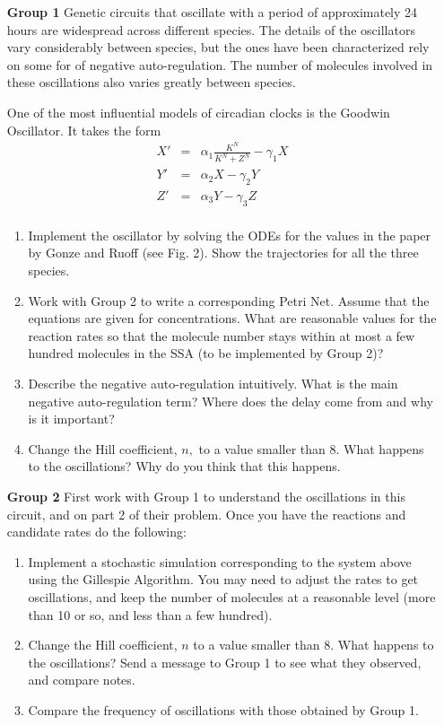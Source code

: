 \documentclass[12pt]{article}
\begin{document}
%
\begin{enumerate}
\item[\bf Group 1] Genetic circuits that oscillate with a period of approximately 24 hours are widespread across different species.  The details of the oscillators  vary considerably between species, but  the ones have been characterized rely on some for of negative auto-regulation. The number of molecules involved in these oscillations also varies greatly between species. 

One of the most influential models of circadian clocks is the Goodwin Oscillator.  It takes the form 
\begin{eqnarray*}
X' &=& \alpha_1 \frac{K^N}{K^N + Z^N} - \gamma_1 X \\
Y' &= & \alpha_2 X - \gamma_2 Y \\
Z' &=& \alpha_3 Y - \gamma_3 Z \\
\end{eqnarray*}

\begin{enumerate}
\item Implement the oscillator by solving the ODEs for the values in the paper by Gonze and Ruoff (see Fig. 2).  Show the trajectories for all the three species.
\item Work with Group 2 to write a corresponding Petri Net.  Assume that the equations are given for concentrations. What are reasonable values for the reaction rates so that the molecule number stays within at most a few hundred molecules in the SSA (to be implemented by Group 2)?  
\item Describe the negative auto-regulation intuitively. What is the main negative auto-regulation term?  Where does the delay come from and why is it important?
\item Change the Hill coefficient, $n,$ to a value smaller than 8. What happens to the oscillations?  Why do you think that this happens.
\end{enumerate}

\item[\bf Group 2] 
First work with Group 1 to understand the oscillations in this circuit, and on part 2 of their problem. Once you have the reactions 
and candidate rates do the following:
\begin{enumerate}
\item Implement a stochastic simulation corresponding to the system above using the Gillespie Algorithm.  You may need to 
adjust the rates to get oscillations, and keep the number of molecules at a reasonable level (more than 10 or so, and less than a few hundred).
\item Change the Hill coefficient, $n$ to a value smaller than 8. What happens to the oscillations?  Send a message to Group 1 to see
what they observed, and compare notes.
\item Compare the frequency of oscillations with those obtained by Group 1.  
\end{enumerate}


\end{enumerate}
\end{document}
